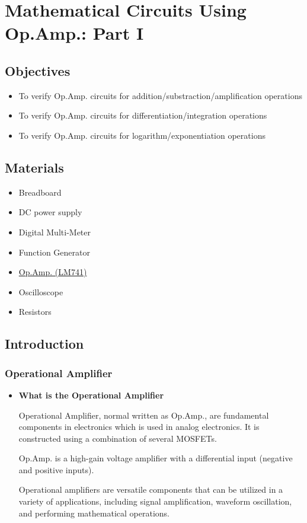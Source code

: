 \chapter{Mathematical Circuits Using Op.Amp.: Part I}


\section{Objectives}
\begin{itemize}
    \item To verify Op.Amp. circuits for addition/substraction/amplification operations
    \item To verify Op.Amp. circuits for differentiation/integration operations
    \item To verify Op.Amp. circuits for logarithm/exponentiation operations
\end{itemize}

\section{Materials}
\begin{itemize}
    \item Breadboard
    \item DC power supply
    \item Digital Multi-Meter
    \item Function Generator
    \item \hyperref[LM741_1]{Op.Amp. (LM741)}
    \item Oscilloscope
    \item Resistors
\end{itemize}

\section{Introduction}
    \subsection{Operational Amplifier}
        \begin{itemize}
            \item \textbf{What is the Operational Amplifier}\par
                Operational Amplifier, normal written as Op.Amp., are fundamental components in electronics which is used in analog electronics. It is constructed using a combination of several MOSFETs.\par
                Op.Amp. is a high-gain voltage amplifier with a differential input (negative and positive inputs).\par
                Operational amplifiers are versatile components that can be utilized in a variety of applications, including signal amplification, waveform oscillation, and performing mathematical operations.
        \end{itemize}
